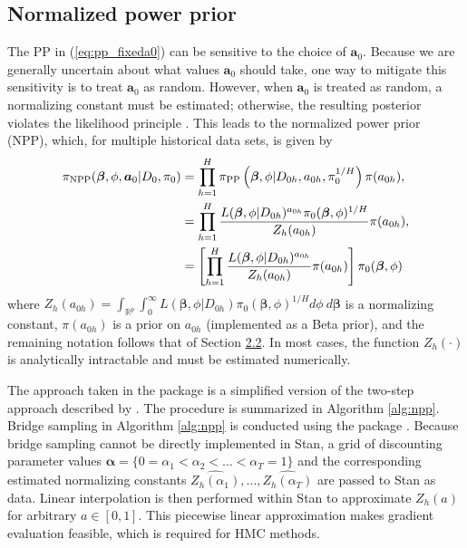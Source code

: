 \subsection{Normalized power prior}
\label{sec:npp}
The PP in (\ref{eq:pp_fixeda0}) can be sensitive to the choice of $\bm{a}_0$. Because we are generally uncertain about what values $\bm{a}_0$ should take, one way to mitigate this sensitivity is to treat $\bm{a}_0$ as random. However, when $\bm{a}_0$ is treated as random, a normalizing constant must be estimated; otherwise, the resulting posterior violates the likelihood principle \citep{duan2006evaluating,neuenschwander2009note}.
This leads to the normalized power prior (NPP), which, for multiple historical data sets, is given by
\begin{align}
    \pi_{\text{NPP}}(\bm{\beta}, \phi, \bm{a}_0 | D_0, \pi_0)
    &= \prod_{h=1}^H \pi_{\text{PP}}\left(\bm{\beta}, \phi | D_{0h}, a_{0h}, \pi_{0}^{1/H}\right)
    \pi(a_{0h})
    ,\notag \\
    &= \prod_{h=1}^H
    \frac{ L(\bm{\beta}, \phi | D_{0h})^{a_{0h}}
    \pi_0(\bm{\beta}, \phi)^{1/H}}
    {Z_h(a_{0h})} \pi(a_{0h})
    ,\notag\\
    &= \left[\prod_{h = 1}^{H} 
        \frac{L(\bm{\beta}, \phi | D_{0h})^{a_{0h}}
        }{Z_h(a_{0h})}
        \pi(a_{0h})
    \right]
    \pi_0(\bm{\beta}, \phi)
    \label{eq:npp}
\end{align}
where $Z_h(a_{0h}) = \int_{\mathbb{R}^p} \int_{0}^{\infty} L(\bm{\beta}, \phi | D_{0h}) \pi_0(\bm{\beta}, \phi)^{1/H} d\phi ~d\bm{\beta}$ is a normalizing constant, $\pi(a_{0h})$ is a prior on $a_{0h}$ (implemented as a Beta prior), and the remaining notation follows that of Section \hyperref[sec:pp]{2.2}.
In most cases, the function $Z_h(\cdot)$ is analytically intractable and must be estimated numerically. 

The approach taken in the  package is a simplified version of the two-step approach described by \cite{carvalho2021normalized}.
The procedure is summarized in Algorithm \ref{alg:npp}. Bridge sampling in Algorithm \ref{alg:npp} is conducted using the  package \citep{Gronau2020}.
Because bridge sampling cannot be directly implemented in Stan, a grid of discounting parameter values $\bm{\alpha} = \{ 0 = \alpha_1 < \alpha_2 < \ldots < \alpha_T = 1 \}$ and the corresponding estimated normalizing constants $\widehat{Z_h(\alpha_1)}, \ldots, \widehat{Z_h(\alpha_T)}$ are passed to Stan as data. Linear interpolation is then performed within Stan to approximate $Z_h(a)$ for arbitrary $a \in [0, 1]$. This piecewise linear approximation makes gradient evaluation feasible, which is required for HMC methods.

